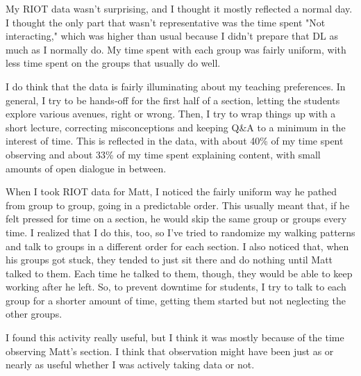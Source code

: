 \documentclass[11pt]{article}
\begin{document}
\insertTitle

My RIOT data wasn't surprising, and I thought it mostly reflected a normal day. I thought the only part that wasn't representative was the time spent "Not interacting," which was higher than usual because I didn't prepare that DL as much as I normally do. My time spent with each group was fairly uniform, with less time spent on the groups that usually do well.

I do think that the data is fairly illuminating about my teaching preferences. In general, I try to be hands-off for the first half of a section, letting the students explore various avenues, right or wrong. Then, I try to wrap things up with a short lecture, correcting misconceptions and keeping Q\&A to a minimum in the interest of time. This is reflected in the data, with about 40\% of my time spent observing and about 33\% of my time spent explaining content, with small amounts of open dialogue in between.

When I took RIOT data for Matt, I noticed the fairly uniform way he pathed from group to group, going in a predictable order. This usually meant that, if he felt pressed for time on a section, he would skip the same group or groups every time. I realized that I do this, too, so I've tried to randomize my walking patterns and talk to groups in a different order for each section. I also noticed that, when his groups got stuck, they tended to just sit there and do nothing until Matt talked to them. Each time he talked to them, though, they would be able to keep working after he left. So, to prevent downtime for students, I try to talk to each group for a shorter amount of time, getting them started but not neglecting the other groups.

I found this activity really useful, but I think it was mostly because of the time observing Matt's section. I think that observation might have been just as or nearly as useful whether I was actively taking data or not.
\end{document}
